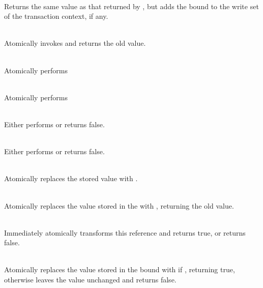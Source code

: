 {\vspace{4pt}

\\ Returns the same value as
that returned by , but adds the bound  to the write
set of the transaction context, if any.

\code{): }\\ Atomically
invokes  and returns the old value.

\code{): }\\
Atomically performs
\code{ \}}

\code{): }\\
Atomically performs
\code{ \}}

\code{): }\\
Either performs  or returns false.

\code{): }\\
Either performs  or returns false.

\code{ => }\code{) }\\
Atomically replaces the stored value  with .

\code{ => }\code{): }\\
Atomically replaces the value  stored in the 
with , returning the old value.

\code{ => }\code{): } \\
Immediately atomically transforms this reference and returns true,
or returns false.

\code{[}\code{,}\code{]):}
\\
Atomically replaces the value  stored in the bound 
with  if , returning true, otherwise
leaves the value unchanged and returns false.

}

